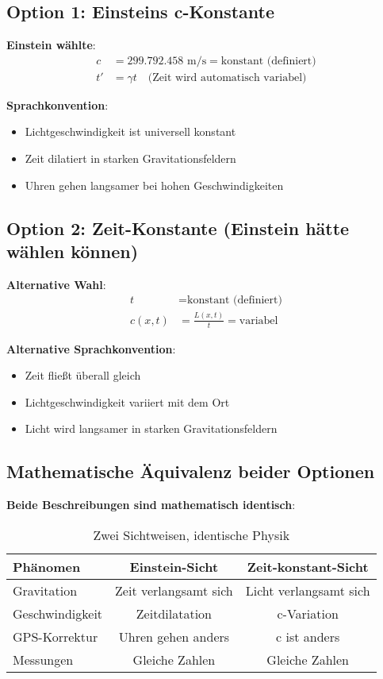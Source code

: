 \documentclass[12pt,a4paper]{article}
\begin{document}
	\subsection{Option 1: Einsteins c-Konstante}
	
	\textbf{Einstein wählte}:
	\begin{align}
		c &= 299.792.458 \text{ m/s} = \text{konstant (definiert)} \\
		t' &= \gamma t \quad \text{(Zeit wird automatisch variabel)}
	\end{align}
	
	\textbf{Sprachkonvention}:
	\begin{itemize}
		\item Lichtgeschwindigkeit ist universell konstant
		\item Zeit dilatiert in starken Gravitationsfeldern
		\item Uhren gehen langsamer bei hohen Geschwindigkeiten
	\end{itemize}
	
	\subsection{Option 2: Zeit-Konstante (Einstein hätte wählen können)}
	
	\textbf{Alternative Wahl}:
	\begin{align}
		t &= \text{konstant (definiert)} \\
		c(x,t) &= \frac{L(x,t)}{t} = \text{variabel}
	\end{align}
	
	\textbf{Alternative Sprachkonvention}:
	\begin{itemize}
		\item Zeit fließt überall gleich
		\item Lichtgeschwindigkeit variiert mit dem Ort
		\item Licht wird langsamer in starken Gravitationsfeldern
	\end{itemize}
	
	\subsection{Mathematische Äquivalenz beider Optionen}
	
	\textbf{Beide Beschreibungen sind mathematisch identisch}:
	
	\begin{table}[htbp]
		\centering
		\begin{tabular}{|l|c|c|}
			\hline
			\textbf{Phänomen} & \textbf{Einstein-Sicht} & \textbf{Zeit-konstant-Sicht} \\
			\hline
			Gravitation & Zeit verlangsamt sich & Licht verlangsamt sich \\
			Geschwindigkeit & Zeitdilatation & c-Variation \\
			GPS-Korrektur & Uhren gehen anders & c ist anders \\
			Messungen & Gleiche Zahlen & Gleiche Zahlen \\
			\hline
		\end{tabular}
		\caption{Zwei Sichtweisen, identische Physik}
	\end{table}
	
\end{document}

